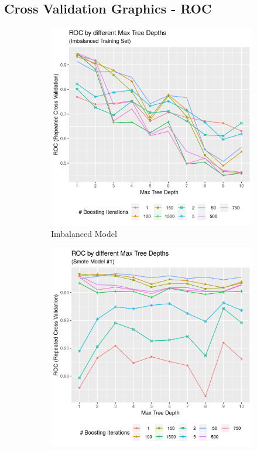 \documentclass[12pt,a4paper]{article}
\begin{document}
\begin{appendices}
\section{Cross Validation Graphics - ROC}\label{app:cv_graphics_roc}
\begin{figure}[h!] %
\begin{subfigure}{0.48\textwidth}
\includegraphics[width=\linewidth]{./graphics/cv/ROC_by_treeDepth_complete.png}
\caption{Imbalanced Model} \label{app:cv_graphics_roc_imb}
\end{subfigure}\hspace*{\fill}
\begin{subfigure}{0.48\textwidth}
\includegraphics[width=\linewidth]{./graphics/cv/ROC_by_treeDepth_smote1.png}

\end{subfigure}
\end{figure}
\end{appendices}
\end{document}
